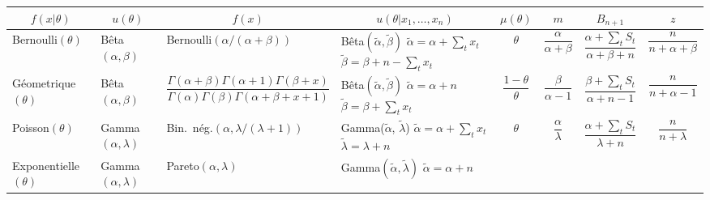 \begin{center}
  \begin{sideways}
    \begin{tabular}{lllp{30mm}cccc}
      \toprule
      \multicolumn{1}{c}{$f(x|\theta)$} &
      \multicolumn{1}{c}{$u(\theta)$} &
      \multicolumn{1}{c}{$f(x)$} &
      \multicolumn{1}{c}{$u(\theta|x_1, \dots, x_n)$} &
      $\mu(\theta)$ &
      $m$ &
      $B_{n+1}$ &
      $z$ \\
      \midrule
      Bernoulli$(\theta)$ &
      Bêta$(\alpha, \beta)$ &
      Bernoulli$(\alpha/(\alpha + \beta))$ &
      Bêta$(\tilde{\alpha}, \tilde{\beta})$ \newline
      $\tilde{\alpha} = \alpha + \sum_t x_t$ \newline
      $\tilde{\beta} = \beta + n - \sum_t x_t$ &
      $\theta$ &
      $\dfrac{\alpha}{\alpha + \beta}$ &
      $\dfrac{\alpha + \sum_t S_t}{\alpha + \beta + n}$ &
      $\dfrac{n}{n + \alpha + \beta}$ \\
      \midrule
      Géometrique$(\theta)$ &
      Bêta$(\alpha, \beta)$ &
      $\dfrac{\Gamma(\alpha + \beta) \Gamma(\alpha + 1) \Gamma(\beta + x)}
      {\Gamma(\alpha) \Gamma(\beta) \Gamma(\alpha + \beta + x + 1)}$ &
      Bêta$(\tilde{\alpha}, \tilde{\beta})$ \newline
      $\tilde{\alpha} = \alpha + n$ \newline
      $\tilde{\beta} = \beta + \sum_t x_t$ &
      $\dfrac{1 - \theta}{\theta}$ &
      $\dfrac{\beta}{\alpha - 1}$ &
      $\dfrac{\beta + \sum_t S_t}{\alpha + n - 1}$ &
      $\dfrac{n}{n + \alpha - 1}$ \\
      \midrule
      Poisson$(\theta)$ &
      Gamma$(\alpha, \lambda)$ &
      Bin.\ nég.$(\alpha, \lambda/(\lambda + 1))$ &
      Gamma($\tilde{\alpha}$, $\tilde{\lambda}$) \newline
      $\tilde{\alpha} = \alpha + \sum_t x_t$ \newline
      $\tilde{\lambda} = \lambda + n$ &
      $\theta$ &
      $\dfrac{\alpha}{\lambda}$ &
      $\dfrac{\alpha + \sum_t S_t}{\lambda + n}$ &
      $\dfrac{n}{n + \lambda}$ \\
      \midrule
      Exponentielle$(\theta)$ &
      Gamma$(\alpha, \lambda)$ &
      Pareto$(\alpha, \lambda)$ &
      Gamma$(\tilde{\alpha}, \tilde{\lambda})$ \newline
      $\tilde{\alpha} = \alpha + n$ \newline

\end{tabular}
\end{sideways}
\end{center}
